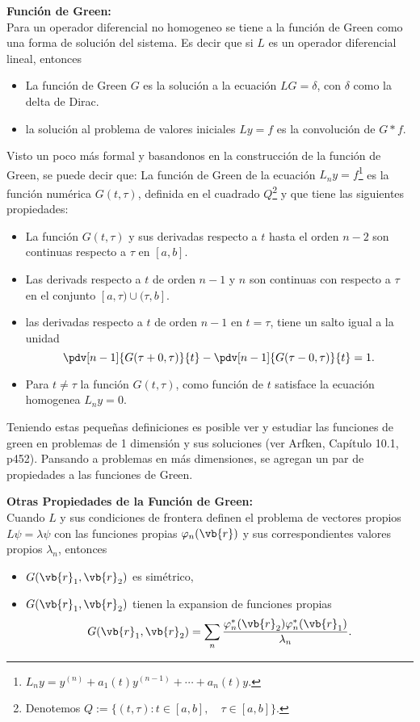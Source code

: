 \begin{mdframed}[style=warning]
	{\Large \textbf{Función de Green:}} \\
	Para un operador diferencial no homogeneo se tiene a la función de Green como una forma de solución del sistema. Es decir que si $L$ es un operador diferencial lineal, entonces
	\begin{itemize}
		\item La función de Green $G$ es la solución a la ecuación $LG = \delta$, con $\delta$ como la delta de Dirac.
		\item la solución al problema de valores iniciales $Ly = f$ es la convolución de $G\ast f$.
	\end{itemize}
	
	Visto un poco más formal y basandonos en la construcción de la función de Green, se puede decir que: La función de Green de la ecuación $L_n y = f$\footnote{$L_n y = y^{(n)} + a_1 (t) y^{(n - 1)} + \cdots + a_n (t) y $.} es la función numérica $G(t,\tau)$, definida en el cuadrado $Q$\footnote{Denotemos $Q := \{ (t,\tau) : t\in [a,b],\quad \tau \in [a,b] \} $.} y que tiene las siguientes propiedades:
	\begin{itemize}
		\item La función $G(t,\tau)$ y sus derivadas respecto a $t$ hasta el orden $n-2$ son continuas respecto a $\tau$ en $[a,b]$.
		\item Las derivads respecto a $t$ de orden $n-1$ y $n$ son continuas con respecto a $\tau$ en el conjunto $[a,\tau) \cup (\tau ,b]$.
		\item las derivadas respecto a $t$ de orden $n-1$ en $t=\tau$, tiene un salto igual a la unidad
			$$ \pdv[n-1]{G(\tau + 0,\tau)}{t} - \pdv[n-1]{G(\tau - 0,\tau)}{t} = 1. $$
		\item Para $t \neq \tau$ la función $G(t,\tau)$, como función de $t$ satisface la ecuación homogenea $L_n y = 0$.
	\end{itemize}
\end{mdframed}



Teniendo estas pequeñas definiciones es posible ver y estudiar las funciones de green en problemas de 1 dimensión y sus soluciones (ver Arfken, Capítulo 10.1, p452). Pansando a problemas en más dimensiones, se agregan un par de propiedades a las funciones de Green.


\begin{mdframed}[style=warning]
	{\Large \textbf{Otras Propiedades de la Función de Green:}} \\
	Cuando $L$ y sus condiciones de frontera definen el problema de vectores propios $L\psi = \lambda \psi$ con las funciones propias $\varphi _n (\vb{r})$ y sus correspondientes valores propios $\lambda _n$, entonces
	\begin{itemize}
		\item $G(\vb{r} _1,\vb{r} _2)$ es simétrico,
		\item $G(\vb{r} _1,\vb{r} _2)$ tienen la expansion de funciones propias
			$$ G(\vb{r} _1,\vb{r} _2) = \sum _n \frac{\varphi _n ^\ast (\vb{r} _2) \varphi _n ^\ast (\vb{r} _1)}{\lambda _n}. $$
	\end{itemize}
\end{mdframed}

